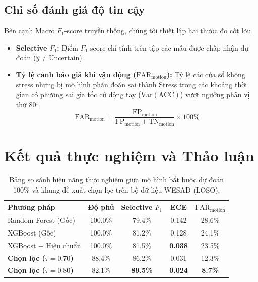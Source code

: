 \documentclass[conference]{IEEEtran}
\begin{document}
\subsection{Chỉ số đánh giá độ tin cậy}
Bên cạnh Macro $F_1$-score truyền thống, chúng tôi thiết lập hai thước đo cốt lõi:
\begin{itemize}
    \item \textbf{Selective $F_1$:} Điểm $F_1$-score chỉ tính trên tập các mẫu được chấp nhận dự đoán ($\hat{y} \neq \text{Uncertain}$).
    \item \textbf{Tỷ lệ cảnh báo giả khi vận động ($\text{FAR}_{\text{motion}}$):} Tỷ lệ các cửa sổ không stress nhưng bị mô hình phán đoán sai thành Stress trong các khoảng thời gian có phương sai gia tốc cử động tay ($\text{Var}(\text{ACC})$) vượt ngưỡng phân vị thứ 80:
    \begin{equation}
    \text{FAR}_{\text{motion}} = \frac{\text{FP}_{\text{motion}}}{\text{FP}_{\text{motion}} + \text{TN}_{\text{motion}}} \times 100\%
    \end{equation}
\end{itemize}

\section{Kết quả thực nghiệm và Thảo luận}

\begin{table}[htbp]
\caption{Bảng so sánh hiệu năng thực nghiệm giữa mô hình bắt buộc dự đoán 100\% và khung đề xuất chọn lọc trên bộ dữ liệu WESAD (LOSO).}
\label{tab:ketqua}
\centering
\begin{tabular}{lcccc}
\toprule
\textbf{Phương pháp} & \textbf{Độ phủ} & \textbf{Selective $F_1$} & \textbf{ECE} & $\text{FAR}_{\text{motion}}$ \\
\midrule
Random Forest (Gốc)      & 100.0\% & 79.4\% & 0.142 & 28.6\% \\
XGBoost (Gốc)            & 100.0\% & 81.2\% & 0.128 & 24.1\% \\
XGBoost + Hiệu chuẩn     & 100.0\% & 81.5\% & \textbf{0.038} & 23.5\% \\
\midrule
\textbf{Chọn lọc ($\tau=0.70$)} & 88.4\% & 86.2\% & 0.031 & 12.3\% \\
\textbf{Chọn lọc ($\tau=0.80$)} & 82.1\% & \textbf{89.5\%} & \textbf{0.024} & \textbf{8.7\%} \\
\bottomrule
\end{tabular}
\end{table}
\end{document}

